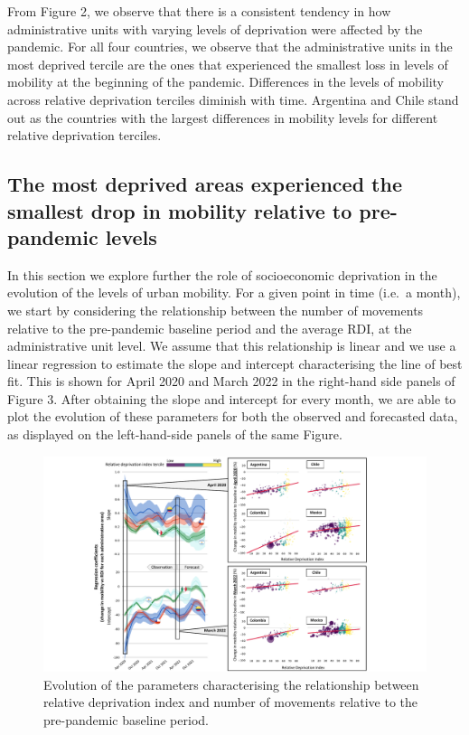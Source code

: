 \documentclass[
  11pt,
]{article}
\begin{document}
From Figure 2, we observe that there is a consistent tendency in how
administrative units with varying levels of deprivation were affected by
the pandemic. For all four countries, we observe that the administrative
units in the most deprived tercile are the ones that experienced the
smallest loss in levels of mobility at the beginning of the pandemic.
Differences in the levels of mobility across relative deprivation
terciles diminish with time. Argentina and Chile stand out as the
countries with the largest differences in mobility levels for different
relative deprivation terciles.

\subsection{The most deprived areas experienced the smallest drop in
mobility relative to pre-pandemic
levels}\label{the-most-deprived-areas-experienced-the-smallest-drop-in-mobility-relative-to-pre-pandemic-levels}

In this section we explore further the role of socioeconomic deprivation
in the evolution of the levels of urban mobility. For a given point in
time (i.e.~a month), we start by considering the relationship between
the number of movements relative to the pre-pandemic baseline period and
the average RDI, at the administrative unit level. We assume that this
relationship is linear and we use a linear regression to estimate the
slope and intercept characterising the line of best fit. This is shown
for April 2020 and March 2022 in the right-hand side panels of Figure 3.
After obtaining the slope and intercept for every month, we are able to
plot the evolution of these parameters for both the observed and
forecasted data, as displayed on the left-hand-side panels of the same
Figure.

\begin{figure}[H]

{\centering \includegraphics{figures/regression-evo-nobackground.pdf}

}

\caption{Evolution of the parameters characterising the relationship
between relative deprivation index and number of movements relative to
the pre-pandemic baseline period.}

\end{figure}%
\end{document}
